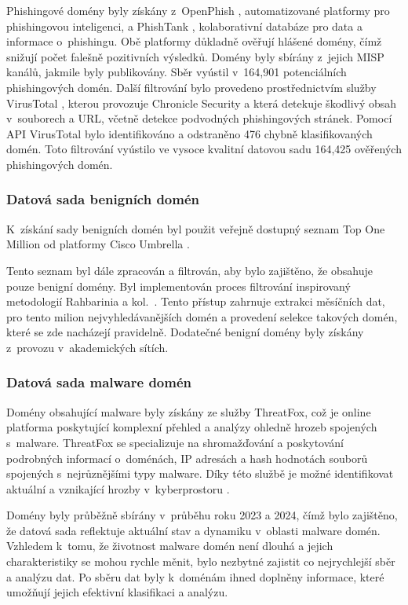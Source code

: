 Phishingové domény byly získány z~OpenPhish \cite{openphish-web}, automatizované platformy pro phishingovou inteligenci, a PhishTank \cite{phishtank-web}, kolaborativní databáze pro data a informace o~phishingu. Obě platformy důkladně ověřují hlášené domény, čímž snižují počet falešně pozitivních výsledků. Domény byly sbírány z~jejich MISP kanálů, jakmile byly publikovány. Sběr vyústil v~164,901 potenciálních phishingových domén. Další filtrování bylo provedeno prostřednictvím služby VirusTotal \cite{virtotal}, kterou provozuje Chronicle Security a která detekuje škodlivý obsah v~souborech a URL, včetně detekce podvodných phishingových stránek. Pomocí API VirusTotal bylo identifikováno a odstraněno 476 chybně klasifikovaných domén. Toto filtrování vyústilo ve vysoce kvalitní datovou sadu 164,425 ověřených phishingových domén. 


\subsubsection{Datová sada benigních domén}
K~získání sady benigních domén byl použit veřejně dostupný seznam Top One Million od platformy Cisco Umbrella \cite{cisco-umbrela-web}. 

Tento seznam byl dále zpracován a filtrován, aby bylo zajištěno, že obsahuje pouze benigní domény. Byl implementován proces filtrování inspirovaný metodologií Rahbarinia a kol.~\cite{rahbarinia2015segugio}. Tento přístup zahrnuje extrakci měsíčních dat, pro tento milion nejvyhledávanějších domén a provedení selekce takových domén, které se zde nacházejí pravidelně. Dodatečné benigní domény byly získány z~provozu v~akademických sítích. 


\subsubsection{Datová sada malware domén}

Domény obsahující malware byly získány ze služby ThreatFox, což je online platforma poskytující komplexní přehled a analýzy ohledně hrozeb spojených s~malware. ThreatFox se specializuje na shromažďování a poskytování podrobných informací o~doménách, IP adresách a hash hodnotách souborů spojených s~nejrůznějšími typy malware. Díky této službě je možné identifikovat aktuální a vznikající hrozby v~kyberprostoru \cite{threatfox-web}.

Domény byly průběžně sbírány v~průběhu roku 2023 a 2024, čímž bylo zajištěno, že datová sada reflektuje aktuální stav a dynamiku v~oblasti malware domén. Vzhledem k~tomu, že životnost malware domén není dlouhá a jejich charakteristiky se mohou rychle měnit, bylo nezbytné zajistit co nejrychlejší sběr a analýzu dat. Po sběru dat byly k~doménám ihned doplněny informace, které umožňují jejich efektivní klasifikaci a analýzu.

